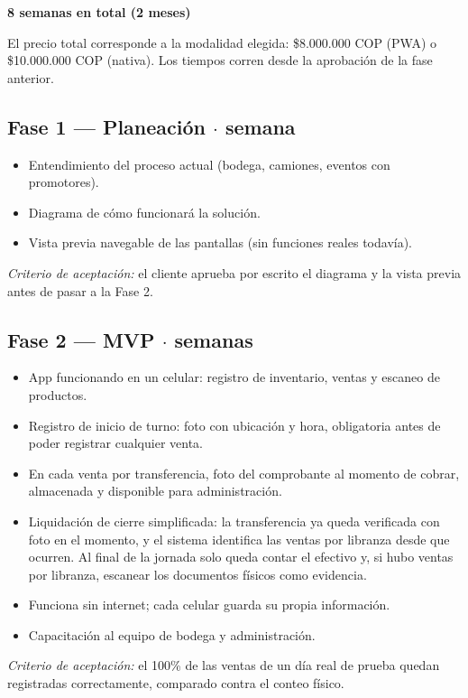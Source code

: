 \documentclass[11pt,a4paper]{article}
\begin{document}
\vspace{4pt}
\begin{center}
{\sffamily\bfseries 8 semanas en total (2 meses)}
\end{center}

El precio total corresponde a la modalidad elegida: \$8.000.000 COP (PWA) o
\$10.000.000 COP (nativa). Los tiempos corren desde la aprobación de la fase anterior.

\subsection*{Fase 1 --- Planeación \quad$\cdot$ semana}
\begin{itemize}
    \item Entendimiento del proceso actual (bodega, camiones, eventos con promotores).
    \item Diagrama de cómo funcionará la solución.
    \item Vista previa navegable de las pantallas (sin funciones reales todavía).
\end{itemize}
\textit{Criterio de aceptación:} el cliente aprueba por escrito el diagrama y la
vista previa antes de pasar a la Fase 2.

\subsection*{Fase 2 --- MVP \quad$\cdot$ semanas}
\begin{itemize}
    \item App funcionando en un celular: registro de inventario, ventas y escaneo de
    productos.
    \item Registro de inicio de turno: foto con ubicación y hora, obligatoria antes de
    poder registrar cualquier venta.
    \item En cada venta por transferencia, foto del comprobante al momento de cobrar,
    almacenada y disponible para administración.
    \item Liquidación de cierre simplificada: la transferencia ya queda verificada con
    foto en el momento, y el sistema identifica las ventas por libranza desde que
    ocurren. Al final de la jornada solo queda contar el efectivo y, si hubo ventas por
    libranza, escanear los documentos físicos como evidencia.
    \item Funciona sin internet; cada celular guarda su propia información.
    \item Capacitación al equipo de bodega y administración.
\end{itemize}
\textit{Criterio de aceptación:} el 100\% de las ventas de un día real de prueba
quedan registradas correctamente, comparado contra el conteo físico.
\end{document}
